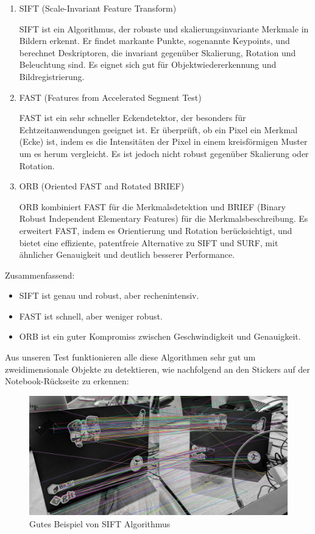\begin{enumerate}
    \item SIFT (Scale-Invariant Feature Transform)
    
    SIFT ist ein Algorithmus, der robuste und skalierungsinvariante Merkmale in Bildern erkennt. Er findet markante Punkte, sogenannte Keypoints, und berechnet Deskriptoren, die invariant gegenüber Skalierung, Rotation und Beleuchtung sind. Es eignet sich gut für Objektwiedererkennung und Bildregistrierung.

    \item FAST (Features from Accelerated Segment Test)
    
    FAST ist ein sehr schneller Eckendetektor, der besonders für Echtzeitanwendungen geeignet ist. Er überprüft, ob ein Pixel ein Merkmal (Ecke) ist, indem es die Intensitäten der Pixel in einem kreisförmigen Muster um es herum vergleicht. Es ist jedoch nicht robust gegenüber Skalierung oder Rotation.

    \item ORB (Oriented FAST and Rotated BRIEF)
    
    ORB kombiniert FAST für die Merkmalsdetektion und BRIEF (Binary Robust Independent Elementary Features) für die Merkmalsbeschreibung. Es erweitert FAST, indem es Orientierung und Rotation berücksichtigt, und bietet eine effiziente, patentfreie Alternative zu SIFT und SURF, mit ähnlicher Genauigkeit und deutlich besserer Performance.
\end{enumerate}

Zusammenfassend:

\begin{itemize}
    \item SIFT ist genau und robust, aber rechenintensiv.
    \item FAST ist schnell, aber weniger robust.
    \item ORB ist ein guter Kompromiss zwischen Geschwindigkeit und Genauigkeit.
\end{itemize}

Aus unseren Test funktionieren alle diese Algorithmen sehr gut um zweidimensionale Objekte zu detektieren, wie nachfolgend an den Stickers auf der Notebook-Rückseite zu erkennen:

\begin{figure}[H]
    \centering
    \includegraphics[width=1\linewidth]{assets/informatik-prototyp/opencv/sift/sift_good_example.png}
    \caption{Gutes Beispiel von SIFT Algorithmus}
    \label{fig:good-sift-example}
\end{figure}


